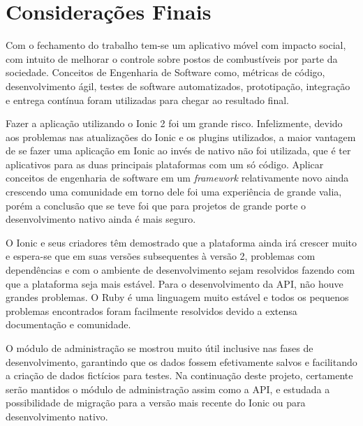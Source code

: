 \section{Considerações Finais}
Com o fechamento do trabalho tem-se um aplicativo móvel com impacto social, com intuito de melhorar o controle sobre postos de combustíveis por parte da sociedade. Conceitos de Engenharia de Software como, métricas de código, desenvolvimento ágil, testes de software automatizados, prototipação, integração e entrega contínua foram utilizadas para chegar ao resultado final.

Fazer a aplicação utilizando o Ionic 2 foi um grande risco. Infelizmente, devido aos problemas nas atualizações do Ionic e os plugins utilizados, a maior vantagem de se fazer uma aplicação em Ionic ao invés de nativo não foi utilizada, que é ter aplicativos para as duas principais plataformas com um só código. Aplicar conceitos de engenharia de software em um \textit{framework} relativamente novo ainda crescendo uma comunidade em torno dele foi uma experiência de grande valia, porém a conclusão que se teve foi que para projetos de grande porte o desenvolvimento nativo ainda é mais seguro.

O Ionic e seus criadores têm demostrado que a plataforma ainda irá crescer muito e espera-se que em suas versões subsequentes à versão 2, problemas com dependências e com o ambiente de desenvolvimento sejam resolvidos fazendo com que a plataforma seja mais estável. Para o desenvolvimento da API, não houve grandes problemas. O Ruby é uma linguagem muito estável e todos os pequenos problemas encontrados foram facilmente resolvidos devido a extensa documentação e comunidade.

O módulo de administração se mostrou muito útil inclusive nas fases de desenvolvimento, garantindo que os dados fossem efetivamente salvos e facilitando a criação de dados fictícios para testes. Na continuação deste projeto, certamente serão mantidos o módulo de administração assim como a API, e estudada a possibilidade de migração para a versão mais recente do Ionic ou para desenvolvimento nativo.
